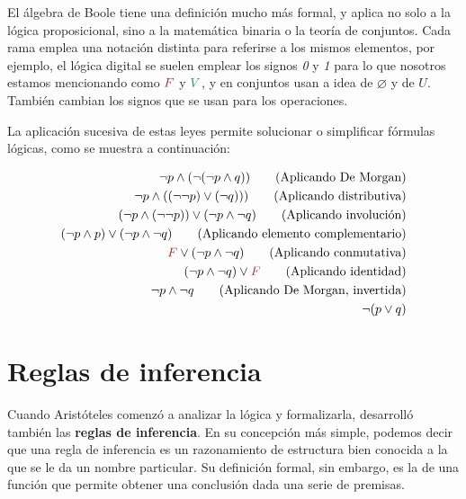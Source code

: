 \begin{knowwhat}
    El álgebra de Boole tiene una definición mucho más formal, y aplica no solo
    a la lógica proposicional, sino a la matemática binaria o la teoría de
    conjuntos. Cada rama emplea una notación distinta para referirse a los
    mismos elementos, por ejemplo, el lógica digital se suelen emplear los
    signos \textit{0} y \textit{1} para lo que nosotros estamos mencionando como
    $\lfalse$ y $\ltrue$, y en conjuntos usan a idea de $\varnothing$ y de $U$.
    También cambian los signos que se usan para los operaciones.
\end{knowwhat}

La aplicación sucesiva de estas leyes permite solucionar o simplificar fórmulas
lógicas, como se muestra a continuación:

\begin{example}
\begin{align}
\lnot p \land (\lnot (\lnot p \land q)) \tag*{(Aplicando De Morgan)}\\
\lnot p \land ((\lnot \lnot p) \lor (\lnot q))) \tag*{(Aplicando distributiva)}\\
(\lnot p \land (\lnot \lnot p)) \lor (\lnot p \land \lnot q) \tag*{(Aplicando involución)}\\
(\lnot p \land p) \lor (\lnot p \land \lnot q) \tag*{(Aplicando elemento complementario)}\\
\lfalse \lor (\lnot p \land \lnot q) \tag*{(Aplicando conmutativa)}\\
(\lnot p \land \lnot q) \lor \lfalse \tag*{(Aplicando identidad)}\\
\lnot p \land \lnot q \tag*{(Aplicando De Morgan, invertida)}\\
\lnot (p \lor q)
\end{align}
\end{example}

\section{Reglas de inferencia}
\label{chap:logica_proposicional:sec:inferencia}

Cuando Aristóteles comenzó a analizar la lógica y formalizarla, desarrolló
también las \textbf{reglas de inferencia}. En su concepción más simple, podemos
decir que una regla de inferencia es un razonamiento de estructura bien conocida
a la que se le da un nombre particular. Su definición formal, sin embargo, es la
de una función que permite obtener una conclusión dada una serie de premisas.

